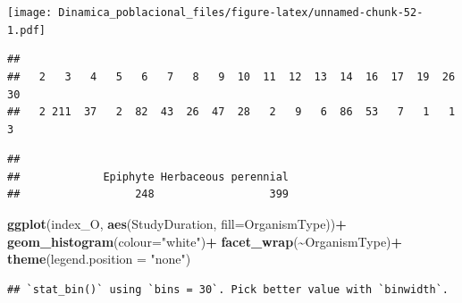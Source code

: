 \documentclass[
]{book}
\newenvironment{Shaded}{\begin{snugshade}}{\end{snugshade}}
\newcommand{\AttributeTok}[1]{\textcolor[rgb]{0.13,0.29,0.53}{#1}}
\newcommand{\FunctionTok}[1]{\textcolor[rgb]{0.13,0.29,0.53}{\textbf{#1}}}
\newcommand{\NormalTok}[1]{#1}
\newcommand{\OtherTok}[1]{\textcolor[rgb]{0.56,0.35,0.01}{#1}}
\newcommand{\SpecialCharTok}[1]{\textcolor[rgb]{0.81,0.36,0.00}{\textbf{#1}}}
\newcommand{\StringTok}[1]{\textcolor[rgb]{0.31,0.60,0.02}{#1}}
\theoremstyle{definition}
\theoremstyle{definition}
\theoremstyle{definition}
\theoremstyle{definition}
\theoremstyle{remark}
\begin{document}
\texttt{[image: Dinamica\_poblacional\_files/figure-latex/unnamed-chunk-52-1.pdf]}

\begin{Shaded}
\end{Shaded}

\begin{verbatim}
## 
##   2   3   4   5   6   7   8   9  10  11  12  13  14  16  17  19  26  30 
##   2 211  37   2  82  43  26  47  28   2   9   6  86  53   7   1   1   3
\end{verbatim}

\begin{Shaded}
\end{Shaded}

\begin{verbatim}
## 
##             Epiphyte Herbaceous perennial 
##                  248                  399
\end{verbatim}

\begin{Shaded}
\begin{Highlighting}[]
\FunctionTok{ggplot}\NormalTok{(index\_O, }\FunctionTok{aes}\NormalTok{(StudyDuration, }\AttributeTok{fill=}\NormalTok{OrganismType))}\SpecialCharTok{+}
         \FunctionTok{geom\_histogram}\NormalTok{(}\AttributeTok{colour=}\StringTok{"white"}\NormalTok{)}\SpecialCharTok{+}
  \FunctionTok{facet\_wrap}\NormalTok{(}\SpecialCharTok{\textasciitilde{}}\NormalTok{OrganismType)}\SpecialCharTok{+}
  \FunctionTok{theme}\NormalTok{(}\AttributeTok{legend.position =} \StringTok{"none"}\NormalTok{)}
\end{Highlighting}
\end{Shaded}

\begin{verbatim}
## `stat_bin()` using `bins = 30`. Pick better value with `binwidth`.
\end{verbatim}
\end{document}
